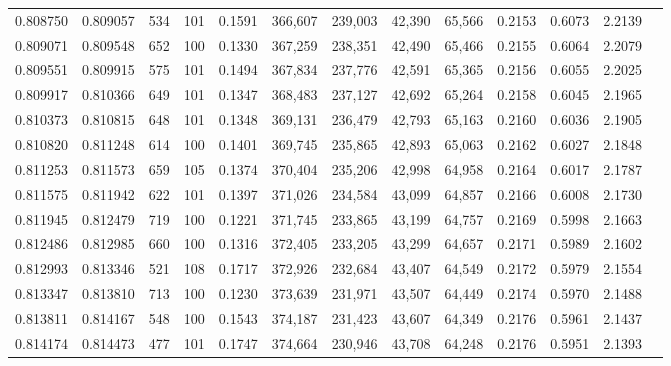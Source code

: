 \begin{tabular}{rrrrrrrrrrrrr}
0.808750 & 0.809057 &   534 & 101 &                                     0.1591 & 366,607 & 239,003 &  42,390 &  65,566 & 0.2153 & 0.6073 & 2.2139 \\
0.809071 & 0.809548 &   652 & 100 &                                     0.1330 & 367,259 & 238,351 &  42,490 &  65,466 & 0.2155 & 0.6064 & 2.2079 \\
0.809551 & 0.809915 &   575 & 101 &                                     0.1494 & 367,834 & 237,776 &  42,591 &  65,365 & 0.2156 & 0.6055 & 2.2025 \\
0.809917 & 0.810366 &   649 & 101 &                                     0.1347 & 368,483 & 237,127 &  42,692 &  65,264 & 0.2158 & 0.6045 & 2.1965 \\
0.810373 & 0.810815 &   648 & 101 &                                     0.1348 & 369,131 & 236,479 &  42,793 &  65,163 & 0.2160 & 0.6036 & 2.1905 \\
0.810820 & 0.811248 &   614 & 100 &                                     0.1401 & 369,745 & 235,865 &  42,893 &  65,063 & 0.2162 & 0.6027 & 2.1848 \\
0.811253 & 0.811573 &   659 & 105 &                                     0.1374 & 370,404 & 235,206 &  42,998 &  64,958 & 0.2164 & 0.6017 & 2.1787 \\
0.811575 & 0.811942 &   622 & 101 &                                     0.1397 & 371,026 & 234,584 &  43,099 &  64,857 & 0.2166 & 0.6008 & 2.1730 \\
0.811945 & 0.812479 &   719 & 100 &                                     0.1221 & 371,745 & 233,865 &  43,199 &  64,757 & 0.2169 & 0.5998 & 2.1663 \\
0.812486 & 0.812985 &   660 & 100 &                                     0.1316 & 372,405 & 233,205 &  43,299 &  64,657 & 0.2171 & 0.5989 & 2.1602 \\
0.812993 & 0.813346 &   521 & 108 &                                     0.1717 & 372,926 & 232,684 &  43,407 &  64,549 & 0.2172 & 0.5979 & 2.1554 \\
0.813347 & 0.813810 &   713 & 100 &                                     0.1230 & 373,639 & 231,971 &  43,507 &  64,449 & 0.2174 & 0.5970 & 2.1488 \\
0.813811 & 0.814167 &   548 & 100 &                                     0.1543 & 374,187 & 231,423 &  43,607 &  64,349 & 0.2176 & 0.5961 & 2.1437 \\
0.814174 & 0.814473 &   477 & 101 &                                     0.1747 & 374,664 & 230,946 &  43,708 &  64,248 & 0.2176 & 0.5951 & 2.1393 \\

\end{tabular}
